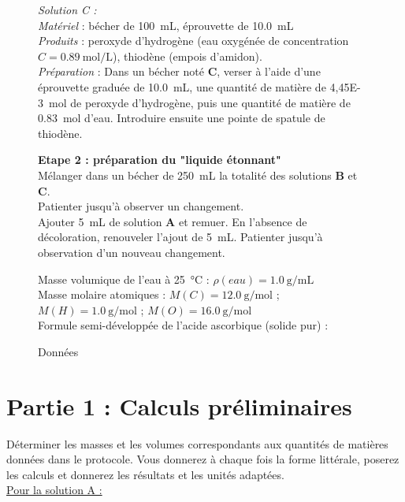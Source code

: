 \documentclass[a4paper,12pt,fleqn]{article}%
\begin{document}
\begin{figure}[h!]
		\begin{minipage}{.98\linewidth}
			\emph{Solution C :}\\
			\textit{Matériel} : bécher de \SI{100}{mL}, éprouvette de \SI{10,0}{mL}\\
			\textit{Produits} : peroxyde d'hydrogène (eau oxygénée de concentration $C = \SI{0,89}{\mole\per\liter}$), thiodène (empois
			d'amidon).\\
			\textit{Préparation} : Dans un bécher noté \textbf{C}, verser à l’aide d’une éprouvette graduée de \SI{10,0}{mL}, une quantité de matière
			de \SI{4,45E-3}{\mole} de peroxyde d’hydrogène, puis une quantité de matière de \SI{0,83}{\mole} d’eau. Introduire ensuite	une pointe de spatule de thiodène.
		\end{minipage}
		
		\vspace{2em}
		\textbf{Etape 2 : préparation du "liquide étonnant"}\\
		Mélanger dans un bécher de \SI{250}{mL} la totalité des solutions \textbf{B} et \textbf{C}.\\
		Patienter jusqu’à observer un changement.\\
		Ajouter \SI{5}{mL} de solution \textbf{A} et remuer. En l’absence de décoloration, renouveler l’ajout de \SI{5}{mL}. Patienter jusqu’à	observation d’un nouveau changement.
	\end{figure}
	
	\begin{figure}[h!]
		\caption{Données}
		\label{doc2}
		Masse volumique de l’eau à \SI{25}{\celsius} : $\rho(eau) = \SI{1,0}{\gram\per\milli\liter}$\\
		Masse molaire atomiques : $M(C) = \SI{12,0}{\gram\per\mole}$ ; $M(H)=\SI{1,0}{\gram\per\mole}$ ; $M(O) = \SI{16,0}{\gram\per\mole}$\\
		Formule semi-développée de l'acide ascorbique (solide pur) :
	\end{figure}

\section*{Partie 1 : Calculs préliminaires}
Déterminer les masses et les volumes correspondants aux quantités de matières données dans le protocole. Vous donnerez à chaque fois la forme littérale, poserez les calculs et donnerez les résultats et les unités adaptées.\\
\underline{Pour la solution A :}\\
\end{document}
